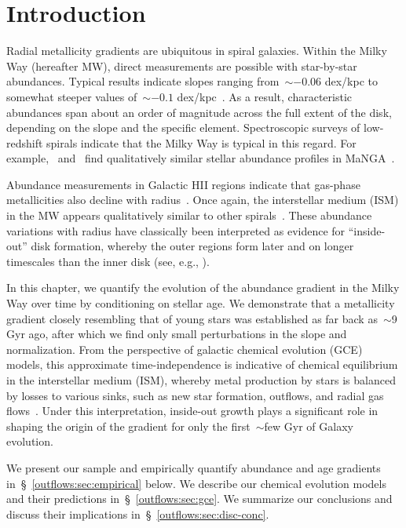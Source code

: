\section{Introduction}
\label{outflows:sec:intro}
Radial metallicity gradients are ubiquitous in spiral galaxies.
Within the Milky Way (hereafter MW), direct measurements are possible with
star-by-star abundances.
Typical results indicate slopes ranging from~$\sim$$-0.06$ dex/kpc to somewhat
steeper values of~$\sim$$-0.1$ dex/kpc~\citep[e.g.,][]{Nordstroem2004,
Cheng2012, Frinchaboy2013, Hayden2014, Weinberg2019, Myers2022}.
As a result, characteristic abundances span about an order of magnitude across
the full extent of the disk, depending on the slope and the specific element.
Spectroscopic surveys of low-redshift spirals indicate that the Milky Way is
typical in this regard.
For example,~\citet{Goddard2017} and~\citet{Parikh2021} find qualitatively
similar stellar abundance profiles in MaNGA~\citep{Bundy2015}.
\par
Abundance measurements in Galactic HII regions indicate that gas-phase
metallicities also decline with radius~\citep[e.g.,][]{Simpson1995,
Afflerbach1997, Esteban2022, MendezDelgado2022, MendezDelgado2023}.
Once again, the interstellar medium (ISM) in the MW appears qualitatively
similar to other spirals~\citep[e.g.,][]{Belfiore2017, Berg2020,
Franchetto2021, Lutz2021, Boardman2022}.
These abundance variations with radius have classically been interpreted as
evidence for ``inside-out'' disk formation, whereby the outer regions form
later and on longer timescales than the inner disk (see, e.g.,
\citealt{Kauffmann1996}).
\par
In this chapter, we quantify the evolution of the abundance gradient in the
Milky Way over time by conditioning on stellar age.
We demonstrate that a metallicity gradient closely resembling that of young
stars was established as far back as~$\sim$9 Gyr ago, after which we find only
small perturbations in the slope and normalization.
From the perspective of galactic chemical evolution (GCE) models, this
approximate time-independence is indicative of chemical equilibrium in the
interstellar medium (ISM), whereby metal production by stars is balanced by
losses to various sinks, such as new star formation, outflows, and radial gas
flows~\citep{Larson1974, Weinberg2017b}.
Under this interpretation, inside-out growth plays a significant role in
shaping the origin of the gradient for only the first~$\sim$few Gyr of Galaxy
evolution.
\par
We present our sample and empirically quantify abundance and age gradients
in~\S~\ref{outflows:sec:empirical} below.
We describe our chemical evolution models and their predictions
in~\S~\ref{outflows:sec:gce}.
We summarize our conclusions and discuss their implications
in~\S~\ref{outflows:sec:disc-conc}.

